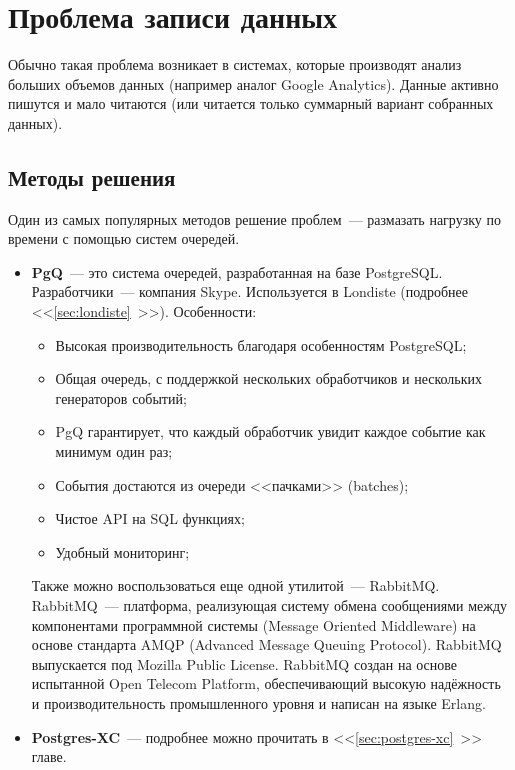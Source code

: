 \section{Проблема записи данных}

Обычно такая проблема возникает в системах, которые производят анализ больших объемов данных (например аналог Google Analytics). Данные активно пишутся и мало читаются (или читается только суммарный вариант собранных данных).

\subsection{Методы решения}

Один из самых популярных методов решение проблем~--- размазать нагрузку по времени с помощью систем очередей.

\begin{itemize}
  \item \textbf{PgQ}~--- это система очередей, разработанная на базе PostgreSQL. Разработчики~--- компания Skype. Используется в Londiste (подробнее <<\ref{sec:londiste}~>>). Особенности:

  \begin{itemize}
    \item Высокая производительность благодаря особенностям PostgreSQL;
    \item Общая очередь, с поддержкой нескольких обработчиков и нескольких генераторов событий;
    \item PgQ гарантирует, что каждый обработчик увидит каждое событие как минимум один раз;
    \item События достаются из очереди <<пачками>> (batches);
    \item Чистое API на SQL функциях;
    \item Удобный мониторинг;
  \end{itemize}

Также можно воспользоваться еще одной утилитой~--- RabbitMQ. RabbitMQ~--- платформа, реализующая систему обмена сообщениями между компонентами программной системы (Message Oriented Middleware) на основе стандарта AMQP (Advanced Message Queuing Protocol). RabbitMQ выпускается под Mozilla Public License. RabbitMQ создан на основе испытанной Open Telecom Platform, обеспечивающий высокую надёжность и производительность промышленного уровня и написан на языке Erlang.

  \item \textbf{Postgres-XC}~--- подробнее можно прочитать в <<\ref{sec:postgres-xc}~>> главе.
\end{itemize}